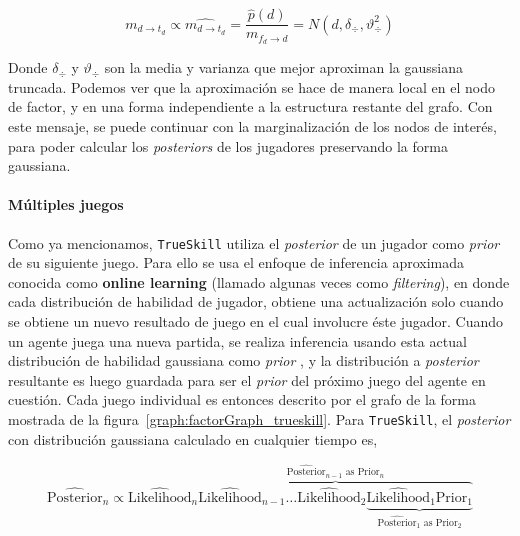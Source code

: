 \documentclass[11pt,twoside,spanish]{report} %
\begin{document}
\begin{equation}\label{eq:aprox_}
 m_{d \rightarrow t_d} \propto\widehat{m_{d \rightarrow t_d}} = \frac{\widehat{p}(d)}{m_{f_d \rightarrow d}} = N(d,\delta_{\div},\vartheta_{\div}^2 )
\end{equation}

Donde $\delta_{\div}$ y $\vartheta_{\div}$ son la media y varianza que mejor aproximan la gaussiana truncada.
Podemos ver que la aproximaci\'on se hace de manera local en el nodo de factor, y en una forma independiente a la estructura restante del grafo.
Con este mensaje, se puede continuar con la marginalizaci\'on de los nodos de inter\'es, para poder calcular los \textit{posteriors} de los jugadores preservando la forma gaussiana.



\paragraph{M\'ultiples juegos}

Como ya mencionamos, \texttt{TrueSkill} utiliza el \textit{posterior} de un jugador como \textit{prior} de su siguiente juego.
Para ello se usa el enfoque de inferencia aproximada conocida como \textbf{online learning} (llamado algunas veces como \textit{filtering}), en donde cada distribuci\'on de habilidad de jugador, obtiene una actualizaci\'on solo cuando se obtiene un nuevo resultado de juego en el cual involucre \'este jugador.
Cuando un agente juega una nueva partida, se realiza inferencia usando esta actual distribuci\'on de habilidad gaussiana como \textit{prior} , y la distribuci\'on a \textit{posterior} resultante es luego guardada para ser el \textit{prior} del pr\'oximo juego del agente en cuesti\'on.
Cada juego individual es entonces descrito por el grafo de la forma mostrada de la figura~\ref{graph:factorGraph_trueskill}.
Para \texttt{TrueSkill}, el \textit{posterior} con distribuci\'on gaussiana calculado en cualquier tiempo es,
 
\begin{equation}
 \widehat{\text{Posterior}}_n \propto \widehat{\text{Likelihood}}_n \overbrace{\widehat{\text{Likelihood}}_{n-1} \dots \widehat{\text{Likelihood}}_{2} \underbrace{\widehat{\text{Likelihood}}_{1} \text{Prior}_1}_{\widehat{\text{Posterior}}_{1} \text{ as } \text{Prior}_{2}} }^{\widehat{\text{Posterior}}_{n-1} \text{ as } \text{Prior}_{n}} 
\end{equation}
\end{document}
